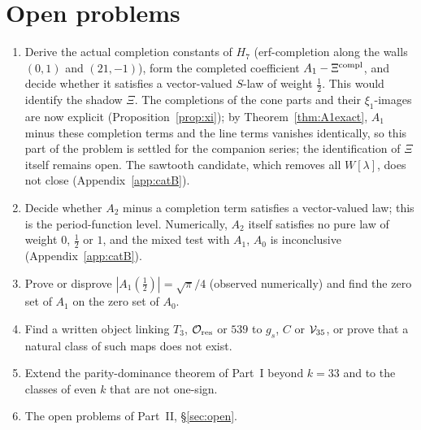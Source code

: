\section{Open problems}\label{sec:gopen}
\begin{enumerate}[label=\arabic*.,leftmargin=2em]
\item\label{op:xi} Derive the actual completion constants of $H_7$ (erf-completion along the walls $(0,1)$ and $(21,-1)$), form the completed coefficient $A_1-\Xi^{\rm compl}$, and
decide whether it satisfies a vector-valued $S$-law of weight $\frac12$. This would identify the shadow $\Xi$. The completions of the cone parts and their $\xi_1$-images are now explicit (Proposition~\ref{prop:xi}); by Theorem~\ref{thm:A1exact}, $A_1$ minus these completion terms and the line terms vanishes identically, so this part of the problem is settled for the companion series; the identification of $\Xi$ itself remains open. The sawtooth candidate, which removes all $W[\lambda]$, does not close (Appendix~\ref{app:catB}).
\item Decide whether $A_2$ minus a completion term satisfies a vector-valued law; this is the period-function level. Numerically, $A_2$ itself satisfies no pure law of weight $0$, $\frac12$ or $1$, and the mixed test with $A_1$, $A_0$ is inconclusive (Appendix~\ref{app:catB}).
\item Prove or disprove $|A_1(\frac12)|=\sqrt\pi/4$ (observed numerically) and find the zero set of $A_1$ on the zero set of $A_0$.
\item Find a written object linking $T_3$, $\mathcal O_{\rm res}$ or $539$ to $g_s$, $C$ or $\mathcal V_{35}$, or prove that a natural class of such maps does not exist.
\item Extend the parity-dominance theorem of Part~I beyond $k=33$ and to the classes of even $k$ that are not one-sign.
\item The open problems of Part~II, \S\ref{sec:open}.
\end{enumerate}
